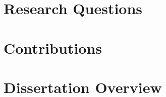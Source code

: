 \documentclass[logo,msc]{infthesis}
\begin{document}
\section{Research Questions}
%
%
%
%

\section{Contributions}
%
%
%
%
%

\section{Dissertation Overview}
\end{document}
